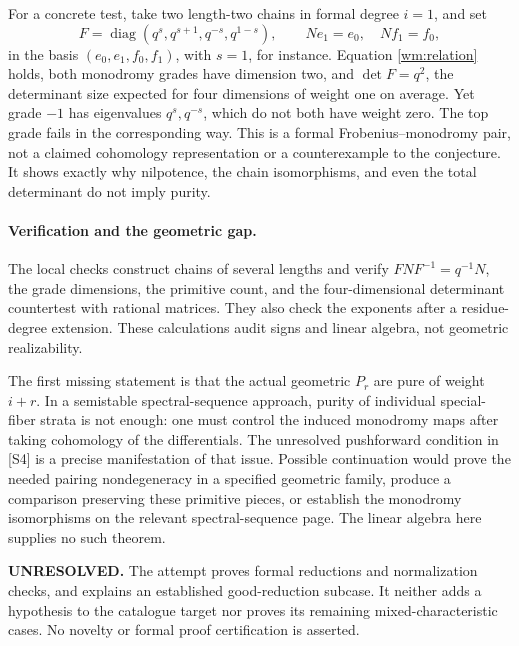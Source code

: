 \documentclass[11pt]{article}
\begin{document}
For a concrete test, take two length-two chains in formal degree $i=1$,
and set
\[
 F=\operatorname{diag}(q^s,q^{s+1},q^{-s},q^{1-s}),
 \qquad Ne_1=e_0,\quad Nf_1=f_0,
\]
in the basis $(e_0,e_1,f_0,f_1)$, with $s=1$, for instance.
Equation \eqref{wm:relation} holds, both monodromy grades have
dimension two, and $\det F=q^2$, the determinant size expected for
four dimensions of weight one on average. Yet grade $-1$ has eigenvalues
$q^s,q^{-s}$, which do not both have weight zero. The top grade fails
in the corresponding way. This is a formal Frobenius--monodromy pair,
not a claimed cohomology representation or a counterexample to the
conjecture. It shows exactly why nilpotence, the chain isomorphisms,
and even the total determinant do not imply purity.

\paragraph{Verification and the geometric gap.}
The local checks construct chains of several lengths and verify
$FNF^{-1}=q^{-1}N$, the grade dimensions, the primitive count, and the
four-dimensional determinant countertest with rational matrices.
They also check the exponents after a residue-degree extension. These
calculations audit signs and linear algebra, not geometric realizability.

The first missing statement is that the actual geometric $P_r$ are
pure of weight $i+r$. In a semistable spectral-sequence approach,
purity of individual special-fiber strata is not enough: one must
control the induced monodromy maps after taking cohomology of the
differentials. The unresolved pushforward condition in [S4] is a
precise manifestation of that issue. Possible continuation would
prove the needed pairing nondegeneracy in a specified geometric
family, produce a comparison preserving these primitive pieces, or
establish the monodromy isomorphisms on the relevant spectral-sequence
page. The linear algebra here supplies no such theorem.

\textbf{UNRESOLVED.} The attempt proves formal reductions and normalization
checks, and explains an established good-reduction subcase. It neither
adds a hypothesis to the catalogue target nor proves its remaining
mixed-characteristic cases. No novelty or formal proof certification
is asserted.
\end{document}
